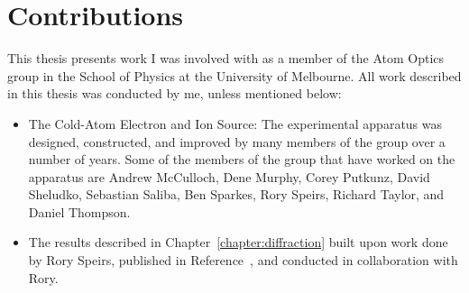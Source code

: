 \chapter*{Contributions}

This thesis presents work I was involved with as a member of the Atom Optics group in the School of Physics at the University of Melbourne.
All work described in this thesis was conducted by me, unless mentioned below:
\begin{itemize}
\item The Cold-Atom Electron and Ion Source: The experimental apparatus was designed, constructed, and improved by many members of the group over a number of years.
Some of the members of the group that have worked on the apparatus are
Andrew McCulloch, Dene Murphy, Corey Putkunz, David Sheludko, Sebastian Saliba, Ben Sparkes, Rory Speirs, Richard Taylor, and Daniel Thompson.
\item The results described in Chapter~\ref{chapter:diffraction} built upon work done by Rory Speirs, published in Reference~\cite{speirs_single-shot_2015}, and conducted in collaboration with Rory.
\end{itemize}